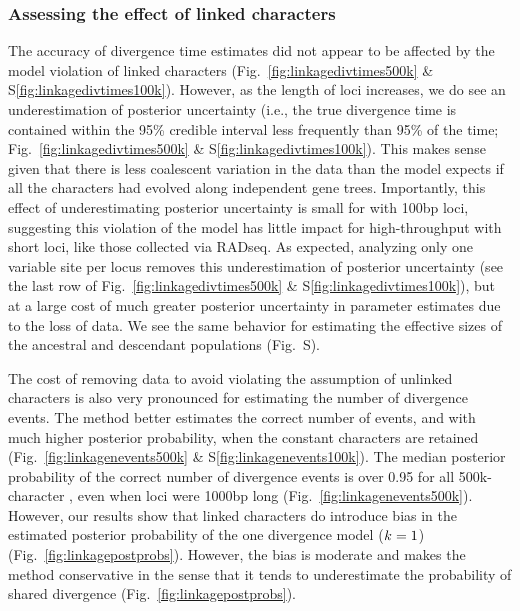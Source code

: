 \subsubsection{Assessing the effect of linked characters}

The accuracy of divergence time estimates did not appear to be affected by the
model violation of linked characters
(Fig.\ \ref{fig:linkagedivtimes500k}
\&
S\ref{fig:linkagedivtimes100k}).
However,
as the length of loci increases, we do see an underestimation
of posterior uncertainty (i.e., the 
true divergence time is contained within the 95\% credible interval
less frequently than 95\% of the time;
Fig.\ \ref{fig:linkagedivtimes500k}
\&
S\ref{fig:linkagedivtimes100k}).
This makes sense given that there is less coalescent variation in the data than
the model expects if all the characters had evolved along independent gene
trees.
Importantly, this effect of underestimating posterior uncertainty is small
for \datasets with 100bp loci, suggesting this violation of the model has little
impact for high-throughput \datasets with short loci, like those collected via
RADseq.
As expected, analyzing only one variable site per locus removes this underestimation
of posterior uncertainty
(see the last row of Fig.\ \ref{fig:linkagedivtimes500k}
\&
S\ref{fig:linkagedivtimes100k}),
but at a large cost of much greater posterior uncertainty in parameter
estimates due to the loss of data.
We see the same behavior for estimating the effective sizes of the ancestral
and descendant populations
(Fig.\ S).

\ifembed{

}{}

The cost of removing data to avoid violating the assumption of unlinked
characters is also very pronounced for estimating the number of divergence
events.
The method better estimates the correct number of events, and with much higher
posterior probability, when the constant characters are retained 
(Fig.\ 
\ref{fig:linkagenevents500k}
\&
S\ref{fig:linkagenevents100k}).
The median posterior probability of the correct number of divergence events is
over 0.95 for all 500k-character \datasets, even when loci were 1000bp long
(Fig.~\ref{fig:linkagenevents500k}).
However, our results show that linked characters do introduce bias in the
estimated posterior probability of the one divergence model ($k_{}{} = 1$)
(Fig.~\ref{fig:linkagepostprobs}).
However, the bias is moderate and makes the method conservative in the
sense that it tends to underestimate the probability of shared
divergence (Fig.~\ref{fig:linkagepostprobs}).

